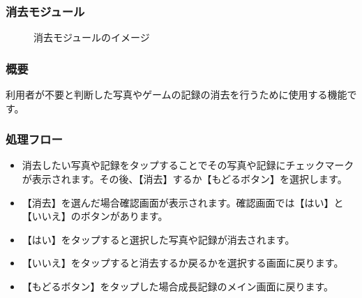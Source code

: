\documentclass[a4j]{jarticle}
\begin{document}
\subsubsection{消去モジュール\label{delete}}
\begin{figure}[H]
    \begin{center}
    \caption {消去モジュールのイメージ}
    \label{functionselection}
    \end{center}
\end{figure}

\subsubsection*{概要}
利用者が不要と判断した写真やゲームの記録の消去を行うために使用する機能です。

\subsubsection*{処理フロー}
\begin{itemize}
\item 消去したい写真や記録をタップすることでその写真や記録にチェックマークが表示されます。その後、【消去】するか【もどるボタン】を選択します。
\item 【消去】を選んだ場合確認画面が表示されます。確認画面では【はい】と【いいえ】のボタンがあります。
\item 【はい】をタップすると選択した写真や記録が消去されます。
\item 【いいえ】をタップすると消去するか戻るかを選択する画面に戻ります。
\item 【もどるボタン】をタップした場合成長記録のメイン画面に戻ります。
\end{itemize}
\end{document}
